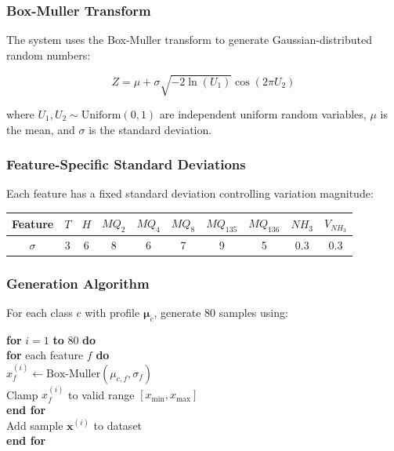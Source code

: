 \documentclass[10pt]{article}
\begin{document}
\subsubsection{Box-Muller Transform}

The system uses the Box-Muller transform to generate Gaussian-distributed random numbers:

\begin{equation}
Z = \mu + \sigma \sqrt{-2 \ln(U_1)} \cos(2\pi U_2)
\end{equation}

where $U_1, U_2 \sim \text{Uniform}(0,1)$ are independent uniform random variables, $\mu$ is the mean, and $\sigma$ is the standard deviation.

\subsubsection{Feature-Specific Standard Deviations}

Each feature has a fixed standard deviation controlling variation magnitude:

\begin{table}[ht]
\centering
\begin{tabular}{|c|c|c|c|c|c|c|c|c|c|}
\hline
\textbf{Feature} & $T$ & $H$ & $MQ_2$ & $MQ_4$ & $MQ_8$ & $MQ_{135}$ & $MQ_{136}$ & $NH_3$ & $V_{NH_3}$ \\
\hline
$\sigma$ & 3 & 6 & 8 & 6 & 7 & 9 & 5 & 0.3 & 0.3 \\
\hline
\end{tabular}
\end{table}

\subsubsection{Generation Algorithm}

For each class $c$ with profile $\boldsymbol{\mu}_c$, generate 80 samples using:

\begin{algorithm}
\textbf{for } $i = 1$ \textbf{to } $80$ \textbf{do}\\
\quad \textbf{for } each feature $f$ \textbf{do}\\
\quad\quad $x_f^{(i)} \leftarrow \text{Box-Muller}(\mu_{c,f}, \sigma_f)$\\
\quad\quad Clamp $x_f^{(i)}$ to valid range $[x_{\min}, x_{\max}]$\\
\quad \textbf{end for}\\
\quad Add sample $\mathbf{x}^{(i)}$ to dataset\\
\textbf{end for}
\end{algorithm}
\end{document}

